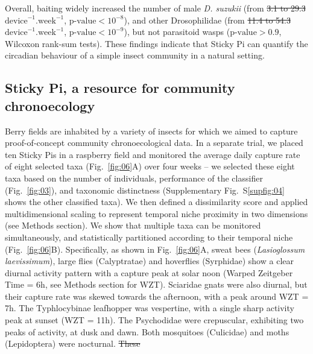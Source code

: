 \documentclass[12pt]{article}
\providecommand{\DIFaddtex}[1]{{\protect\color{blue}\uwave{#1}}} %
\providecommand{\DIFdeltex}[1]{{\protect\color{red}\sout{#1}}}                      %
\providecommand{\DIFaddbegin}{} %
\providecommand{\DIFaddend}{} %
\providecommand{\DIFdelbegin}{} %
\providecommand{\DIFdelend}{} %
\providecommand{\DIFadd}[1]{\texorpdfstring{\DIFaddtex{#1}}{#1}} %
\providecommand{\DIFdel}[1]{\texorpdfstring{\DIFdeltex{#1}}{}} %
\newcommand{\DIFscaledelfig}{0.5}
\newlength{\DIFdelgraphicswidth} %
\newlength{\DIFdelgraphicsheight} %
\newcommand{\DIFaddincludegraphics}[2][]{{\color{blue}\fbox{\DIFOincludegraphics[#1]{#2}}}} %
\newcommand{\DIFdelincludegraphics}[2][]{%
\sbox{\DIFdelgraphicsbox}{\DIFOincludegraphics[#1]{#2}}%
\settoboxwidth{\DIFdelgraphicswidth}{\DIFdelgraphicsbox} %
\settoboxtotalheight{\DIFdelgraphicsheight}{\DIFdelgraphicsbox} %
\scalebox{\DIFscaledelfig}{%
\parbox[b]{\DIFdelgraphicswidth}{\usebox{\DIFdelgraphicsbox}\\[-\baselineskip] \rule{\DIFdelgraphicswidth}{0em}}\llap{\resizebox{\DIFdelgraphicswidth}{\DIFdelgraphicsheight}{%
\setlength{\unitlength}{\DIFdelgraphicswidth}%
\begin{picture}(1,1)%
\thicklines\linethickness{2pt} %
{\color[rgb]{1,0,0}\put(0,0){\framebox(1,1){}}}%
{\color[rgb]{1,0,0}\put(0,0){\line( 1,1){1}}}%
{\color[rgb]{1,0,0}\put(0,1){\line(1,-1){1}}}%
\end{picture}%
}\hspace*{3pt}}} %
} %
\DeclareRobustCommand{\DIFaddbegin}{\DIFOaddbegin \let\includegraphics\DIFaddincludegraphics} %
\DeclareRobustCommand{\DIFaddend}{\DIFOaddend \let\includegraphics\DIFOincludegraphics} %
\DeclareRobustCommand{\DIFdelbegin}{\DIFOdelbegin \let\includegraphics\DIFdelincludegraphics} %
\DeclareRobustCommand{\DIFdelend}{\DIFOaddend \let\includegraphics\DIFOincludegraphics} %
\begin{document}
\begin{linenumbers}
		\DIFaddend Overall, baiting widely increased the number of male \emph{D. suzukii} (from \DIFdelbegin \DIFdel{3.1 to 29.3 }\DIFdelend \DIFaddbegin \DIFadd{3.0 to 26.0 }\DIFaddend $\text{device}^{-1}.\text{week}^{-1}$, \DIFdelbegin \DIFdel{$\text{p-value} < 10^{-8}$}\DIFdelend \DIFaddbegin \DIFadd{$\text{p-value} < 2\times{}10^{-8}$}\DIFaddend ), and other Drosophilidae (from \DIFdelbegin \DIFdel{11.4 to 54.3 }\DIFdelend \DIFaddbegin \DIFadd{8.8 to 49.8 }\DIFaddend $\text{device}^{-1}.\text{week}^{-1}$, $\text{p-value} < 10^{-9}$), but not parasitoid wasps (\DIFdelbegin \DIFdel{$\text{p-value} > 0.9$}\DIFdelend \DIFaddbegin \DIFadd{$\text{p-value} > 0.65$}\DIFaddend , Wilcoxon rank-sum tests).
		These findings indicate that Sticky Pi can quantify the circadian behaviour of a simple insect community in a natural setting.

		\subsection*{Sticky Pi, a resource for community chronoecology}

		Berry fields are inhabited by a variety of insects for which we aimed to capture proof-of-concept community chronoecological data. In a separate trial, we placed ten Sticky Pis in a raspberry field and monitored the average daily capture rate of eight selected taxa (Fig.~\ref{fig:06}A) over four weeks – we selected these eight taxa based on the number of individuals, performance of the classifier (Fig.~\ref{fig:03}), and taxonomic distinctness (Supplementary Fig.~S\ref{supfig:04} shows the other classified taxa). We then defined a dissimilarity score and applied multidimensional scaling to represent temporal niche proximity in two dimensions (see Methods section). We show that multiple taxa can be monitored simultaneously, and statistically partitioned according to their temporal niche (Fig.~\ref{fig:06}B). Specifically, as shown in Fig.~\ref{fig:06}A, sweat bees (\emph{Lasioglossum laevissimum}), large flies (Calyptratae) and hoverflies (Syrphidae) show a clear diurnal activity pattern with a capture peak at solar noon (Warped Zeitgeber Time = 6h, see Methods section for WZT). Sciaridae gnats were also diurnal, but their capture rate was skewed towards the afternoon, with a peak around WZT = 7h. The Typhlocybinae leafhopper was vespertine, with a single sharp activity peak at sunset (WZT = 11h). The Psychodidae were crepuscular, exhibiting two peaks of activity, at dusk and dawn. Both mosquitoes (Culicidae) and moths (Lepidoptera) were nocturnal. 		
		\DIFdelbegin \DIFdel{These }\DIFdelend \DIFaddbegin 


\end{linenumbers}
\end{document}
